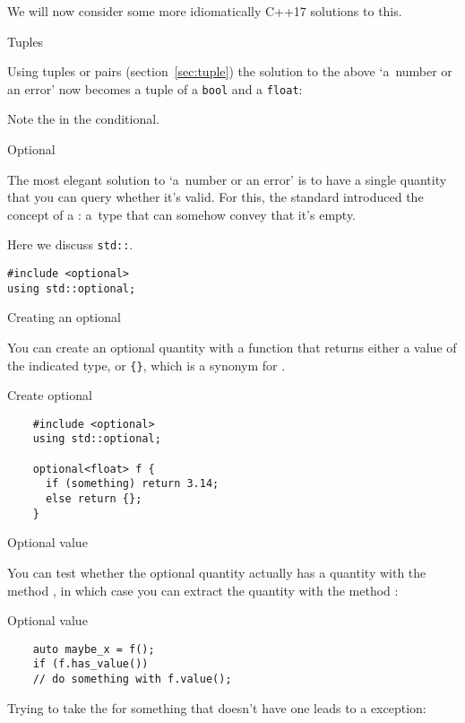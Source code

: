 We will now consider some more idiomatically C++17 solutions to this.

 {Tuples}

Using tuples or pairs (section~\ref{sec:tuple}) 
the solution to the above `a~number or an error' now becomes
a tuple of a \lstinline{bool} and a \lstinline{float}:
%

Note the 
in the conditional.

 {Optional}
\label{sec:std-optional}

The most elegant solution to `a~number or an error' is to have a
single quantity that you can query whether it's valid.
For this, the
 standard
introduced the concept of a :
a~type that can somehow convey that it's empty.

Here we discuss \lstinline{std::}.

\begin{lstlisting}
#include <optional>
using std::optional;
\end{lstlisting}

 {Creating an optional}

You can create an optional quantity with a function that returns
either a value of the indicated type, or \verb+{}+, which is a
synonym for .

\begin{block}{Create optional}
  \label{sl:opt-create}
  \begin{lstlisting}
    #include <optional>
    using std::optional;

    optional<float> f {
      if (something) return 3.14;
      else return {};
    }
  \end{lstlisting}
\end{block}

 {Optional value}

You can test whether the optional quantity actually has a quantity with
the method ,
in which case you can extract the quantity
with the method :

\begin{block}{Optional value}
  \label{sl:opt-value}
  \begin{lstlisting}
    auto maybe_x = f();
    if (f.has_value())
    // do something with f.value();
  \end{lstlisting}

  Trying to take the  for something that doesn't have one
  leads to a  exception:
\end{block}



